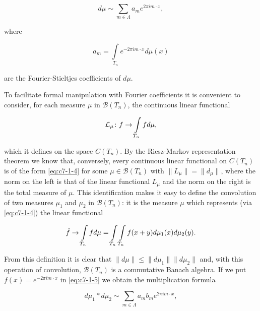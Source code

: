 \begin{equation}\label{eq:c7-1-2}
d\mu\sim\sum_{m\in\Lambda}a_{m}e^{2\pi i m\cdot x},
\end{equation}

where

\begin{equation}\label{eq:c7-1-3}
a_{m}=\int\limits_{T_{n}}e^{-2\pi i m\cdot x}d\mu(x)
\end{equation}

are the Fourier-Stieltjes coefficients of $d\mu$.

To facilitate formal manipulation with Fourier coefficients it is convenient to consider, for each measure $\mu$ in $\mathcal{B}(T_{n})$, the continuous linear functional

\begin{equation}\label{eq:c7-1-4}
{\cal L}_{\mu}\colon f\to\intop_{T_{n}}f d\mu,
\end{equation}

which it defines on the space $C(T_n)$. By the Riesz-Markov representation theorem we know that, conversely, every continuous linear functional on $C(T_n)$ is of the form \eqref{eq:c7-1-4} for some $\mu \in \mathcal{B}(T_n)$ with $\|L_\mu\| = \|d_\mu\|$, where the norm on the left is that of the linear functional $L_\mu$ and the norm on the right is the total measure of $\mu$. This identification makes it easy to define the convolution of two measures $\mu_1$ and $\mu_2$ in $\mathcal{B}(T_n)$: it is the measure $\mu$ which represents (via \eqref{eq:c7-1-4}) the linear functional

\begin{equation}\label{eq:c7-1-5}
\dot{f}\to\intop_{T_{n}}f d\mu=\intop_{T_{n}}\intop_{T_{n}}f(x+y)d\mu_{1}(x)d\mu_{2}(y).
\end{equation}

From this definition it is clear that $\|d\mu\| \leq \|d\mu_1\| \|d\mu_2\|$ and, with this operation of convolution, $\mathcal{B}(T_n)$ is a commutative Banach algebra. If we put $f(x) = e^{-2\pi i m \cdot x}$ in \eqref{eq:c7-1-5} we obtain the multiplication formula

\begin{equation}\label{eq:c7-1-6}
d\mu_{1}*d\mu_{2}\sim\sum_{m\in\Lambda}a_{m}b_{m}e^{2\pi i m\cdot x},
\end{equation}

